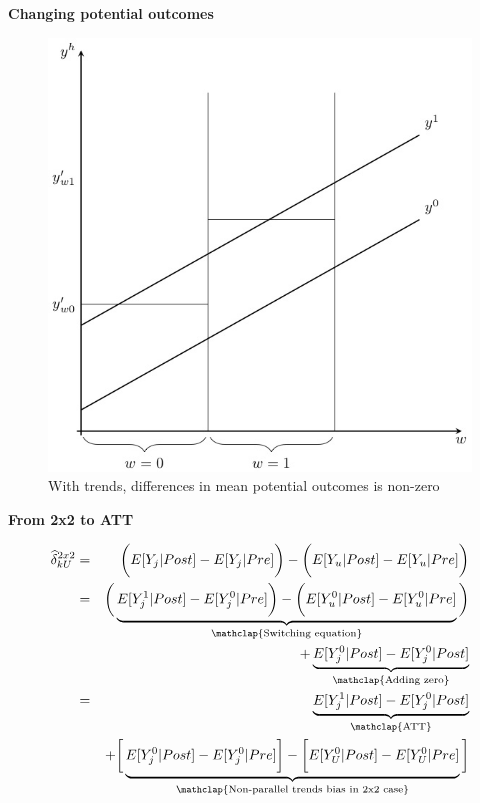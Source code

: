 \documentclass[notes=show]{beamer}
\begin{document}
\begin{frame}[shrink=20,plain]

\begin{center}
\textbf{Changing potential outcomes}
\end{center}

\begin{figure}[htb]
\centering	
\includegraphics[scale=0.5]{./lecture_includes/plots-test.jpg}
\caption{With trends, differences in mean potential outcomes is non-zero}
\end{figure}

\end{frame}


\begin{frame}[plain]
\begin{center}
\textbf{From 2x2 to ATT}
\end{center}

\begin{eqnarray*}
\widehat{\delta}^{2x2}_{kU} &=&\bigg ( E[Y_j|Post] - E[Y_j|Pre] \bigg ) - \bigg ( E[Y_u | Post ] - E[ Y_u | Pre] \bigg) \\
&=&\bigg ( \underbrace{E[Y^1_j|Post] - E[Y^0_j|Pre] \bigg ) - \bigg ( E[Y^0_u | Post ] - E[ Y^0_u | Pre]}_{\mathclap{\text{Switching equation}}} \bigg)  \\
&&+ \underbrace{E[Y_j^0 |Post] - E[Y^0_j | Post]}_{\mathclap{\text{Adding zero}}} \\
&=& \underbrace{E[Y^1_j | Post] - E[Y^0_j | Post]}_{\mathclap{\text{ATT}}} \\
&& + \bigg [  \underbrace{E[Y^0_j | Post] - E[Y^0_j | Pre] \bigg ] - \bigg [ E[Y^0_U | Post] - E[Y_U^0 | Pre] }_{\mathclap{\text{Non-parallel trends bias in 2x2 case}}} \bigg ]
\end{eqnarray*}

\end{frame}
\end{document}
